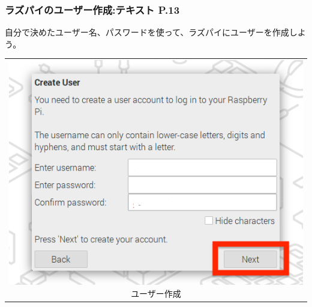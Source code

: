 \documentclass[dvipdfmx]{beamer}
\begin{document}
\begin{frame}[fragile]
	\frametitle{ラズパイのユーザー作成:テキスト P.13~~~}

	自分で決めたユーザー名、パスワードを使って、ラズパイにユーザーを作成しよう。
	\vfill
	\begin{tabular}{c}
		\begin{minipage}{0.32\textwidth}
                {\upshape
                  \includegraphics[width=\textwidth]{sw_image03.png}
                  \newline
                  ユーザー作成}
              \end{minipage}
	\end{tabular}


\end{frame}
\end{document}

